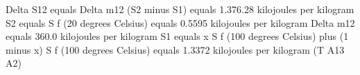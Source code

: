 Delta S12 equals Delta m12 (S2 minus S1) equals 1.376.28 kilojoules per kilogram
S2 equals S f (20 degrees Celsius) equals 0.5595 kilojoules per kilogram
Delta m12 equals 360.0 kilojoules per kilogram
S1 equals x S f (100 degrees Celsius) plus (1 minus x) S f (100 degrees Celsius) equals 1.3372 kilojoules per kilogram (T A13 A2)